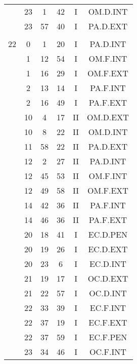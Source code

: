 \documentclass[12pt, a4paper]{article}
\begin{document}
\begin{multicols}{3}
{\begin{tabular}{c c c c c c}
	 	 	 	 & 23 & 1 & 42 & I & OM.D.INT\\%
	 	 	 	 & 23 & 57 & 40 & I & PA.D.EXT\\%
	 	 	 	 & & & & & \\%
	 	 	 	22 & 0 & 1 & 20 & I & PA.D.INT\\%
	 	 	 	 & 1 & 12 & 54 & I & OM.F.INT\\%
	 	 	 	 & 1 & 16 & 29 & I & OM.F.EXT\\%
	 	 	 	 & 2 & 13 & 14 & I & PA.F.INT\\%
	 	 	 	 & 2 & 16 & 49 & I & PA.F.EXT\\%
	 	 	 	 & 10 & 4 & 17 & II & OM.D.EXT\\%
	 	 	 	 & 10 & 8 & 22 & II & OM.D.INT\\%
	 	 	 	 & 11 & 58 & 22 & II & PA.D.EXT\\%
	 	 	 	 & 12 & 2 & 27 & II & PA.D.INT\\%
	 	 	 	 & 12 & 45 & 53 & II & OM.F.INT\\%
	 	 	 	 & 12 & 49 & 58 & II & OM.F.EXT\\%
	 	 	 	 & 14 & 42 & 36 & II & PA.F.INT\\%
	 	 	 	 & 14 & 46 & 36 & II & PA.F.EXT\\%
	 	 	 	 & 20 & 18 & 41 & I & EC.D.PEN\\%
	 	 	 	 & 20 & 19 & 26 & I & EC.D.EXT\\%
	 	 	 	 & 20 & 23 & 6 & I & EC.D.INT\\%
	 	 	 	 & 21 & 19 & 17 & I & OC.D.EXT\\%
	 	 	 	 & 21 & 22 & 57 & I & OC.D.INT\\%
	 	 	 	 & 22 & 33 & 39 & I & EC.F.INT\\%
	 	 	 	 & 22 & 37 & 19 & I & EC.F.EXT\\%
	 	 	 	 & 22 & 37 & 59 & I & EC.F.PEN\\%
	 	 	 	 & 23 & 34 & 46 & I & OC.F.INT\\%
	 	 \end{tabular}
 	}
\end{multicols}
\end{document}
